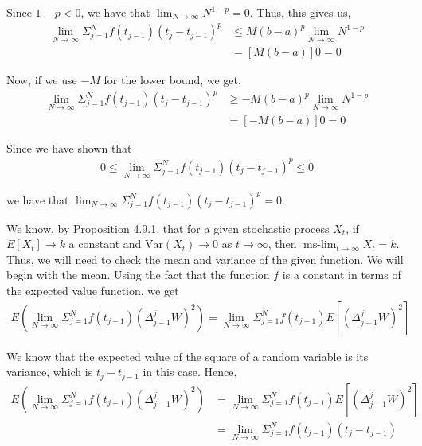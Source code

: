 \documentclass[12pt]{article}
\newenvironment{problem}[2][Problem]{\begin{trivlist}
\item[\hskip \labelsep {\bfseries #1}\hskip \labelsep {\bfseries #2.}]}{\end{trivlist}}
\begin{document}
Since $1-p < 0$, we have that $\lim_{N \to \infty} N^{1-p} = 0$. Thus, this gives us,
\begin{align*}
\lim_{N \to \infty} \Sigma^N_{j=1} f(t_{j-1})(t_j - t_{j-1})^p &\leq M(b-a)^p \lim_{N \to \infty} N^{1-p}\\
&= [M(b-a)]0 = 0
\end{align*}

Now, if we use $-M$ for the lower bound, we get,
\begin{align*}
\lim_{N \to \infty} \Sigma^N_{j=1} f(t_{j-1})(t_j - t_{j-1})^p &\geq -M(b-a)^p \lim_{N \to \infty} N^{1-p}\\
&= [-M(b-a)]0 = 0
\end{align*}

Since we have shown that
\begin{align*}
0 \leq \lim_{N \to \infty} \Sigma^N_{j=1} f(t_{j-1})(t_j - t_{j-1})^p \leq 0
\end{align*}

we have that $\lim_{N \to \infty} \Sigma^N_{j=1} f(t_{j-1})(t_j - t_{j-1})^p = 0$.

\begin{problem}{10}
\end{problem}

We know, by Proposition 4.9.1, that for a given stochastic process $X_t$, if $E[X_t] \to k$ a constant and $\text{Var}(X_t) \to 0$ as $t \to \infty$, then $\operatorname{ms-\lim}_{t \to \infty} X_t = k$.\\

Thus, we will need to check the mean and variance of the given function. We will begin with the mean. Using the fact that the function $f$ is a constant in terms of the expected value function, we get
\begin{align*}
E(\lim_{N \to \infty} \Sigma^N_{j=1} f(t_{j-1}) (\Delta_{j-1}^j W)^2) = \lim_{N \to \infty} \Sigma^N_{j=1} f(t_{j-1}) E[(\Delta_{j-1}^j W)^2]
\end{align*}

We know that the expected value of the square of a random variable is its variance, which is $t_j - t_{j-1}$ in this case. Hence,
\begin{align*}
E(\lim_{N \to \infty} \Sigma^N_{j=1} f(t_{j-1}) (\Delta_{j-1}^j W)^2) &= \lim_{N \to \infty} \Sigma^N_{j=1} f(t_{j-1}) E[(\Delta_{j-1}^j W)^2]\\
&= \lim_{N \to \infty} \Sigma^N_{j=1} f(t_{j-1})(t_j - t_{j-1})
\end{align*}
\end{document}
